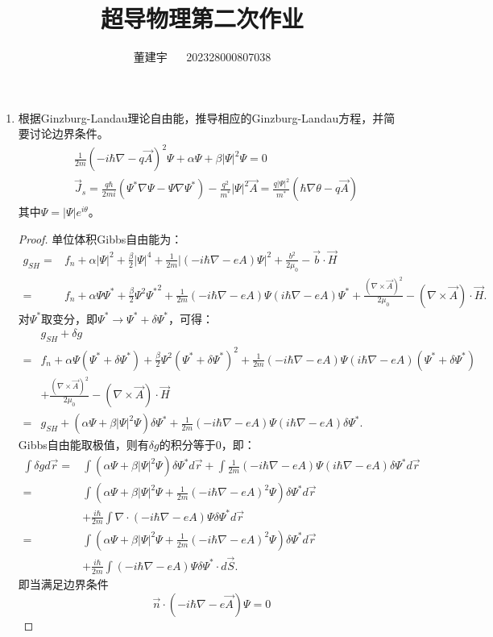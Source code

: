 \documentclass[reqno,a4paper,12pt]{amsart}
\title{超导物理第二次作业}
\author{董建宇 ~~ 202328000807038}
\begin{document}
\maketitle

\begin{enumerate}[1.]

\item 根据Ginzburg-Landau理论自由能，推导相应的Ginzburg-Landau方程，并简要讨论边界条件。
\begin{align*}
	&\frac{1}{2m}(-i\hbar\nabla - q\vec{A})^2\Psi + \alpha \Psi + \beta \vert \Psi \vert^2 \Psi = 0 \\
	&\vec{J}_s = \frac{q\hbar}{2mi}(\Psi^*\nabla\Psi - \Psi\nabla\Psi^*) - \frac{q^2}{m^*} \vert \Psi \vert^2 \vec{A} = \frac{q \vert \Psi \vert^2}{m^*} (\hbar\nabla \theta - q\vec{A})
\end{align*}
其中$\Psi = \vert \Psi \vert e^{i\theta}$。

\begin{proof}
单位体积Gibbs自由能为：
\begin{align*}
	g_{SH} =& f_n + \alpha\vert \Psi \vert^2 + \frac{\beta}{2} \vert \Psi \vert^4 + \frac{1}{2m} \vert (-i\hbar\nabla - eA) \Psi \vert^2 + \frac{b^2}{2\mu_0} - \vec{b} \cdot \vec{H} \\
	=& f_n + \alpha \Psi \Psi^* + \frac{\beta}{2} \Psi^2{\Psi^*}^2 + \frac{1}{2m}(-i\hbar\nabla - eA)\Psi(i\hbar\nabla-eA)\Psi^* + \frac{(\nabla \times \vec{A})^2}{2\mu_0} - (\nabla \times \vec{A}) \cdot \vec{H}.
\end{align*}
对$\Psi^*$取变分，即$\Psi^* \to \Psi^* + \delta \Psi^*$，可得：
\begin{align*}
	&g_{SH} + \delta g \\
	=& f_n + \alpha\Psi(\Psi^*+\delta\Psi^*) + \frac{\beta}{2}\Psi^2(\Psi^*+\delta\Psi^*)^2 + \frac{1}{2m} (-i\hbar\nabla - eA) \Psi (i\hbar\nabla - eA) (\Psi^*+\delta \Psi^*) \\
	&+ \frac{(\nabla\times \vec{A})^2}{2\mu_0} - (\nabla\times\vec{A}) \cdot \vec{H} \\
	=& g_{SH} + (\alpha \Psi + \beta \vert \Psi \vert^2\Psi) \delta\Psi^* + \frac{1}{2m}(-i\hbar\nabla - eA) \Psi (i\hbar\nabla - eA) \delta\Psi^*.
\end{align*}
Gibbs自由能取极值，则有$\delta g$的积分等于0，即：
\begin{align*}
	\int \delta g d\vec{r} =& \int (\alpha \Psi + \beta \vert \Psi \vert^2\Psi) \delta\Psi^* d\vec{r} + \int \frac{1}{2m}(-i\hbar\nabla - eA) \Psi (i\hbar\nabla - eA) \delta\Psi^* d\vec{r} \\
	=& \int \left(\alpha \Psi + \beta \vert \Psi \vert^2 \Psi + \frac{1}{2m}(-i\hbar\nabla - eA)^2\Psi \right) \delta \Psi^* d\vec{r} \\
	&+ \frac{i\hbar}{2m} \int \nabla \cdot (-i\hbar\nabla-eA) \Psi \delta\Psi^* d\vec{r} \\
	=& \int \left(\alpha \Psi + \beta \vert \Psi \vert^2 \Psi + \frac{1}{2m}(-i\hbar\nabla - eA)^2\Psi \right) \delta \Psi^* d\vec{r} \\
	&+ \frac{i\hbar}{2m} \int (-i\hbar\nabla-eA) \Psi \delta\Psi^* \cdot d\vec{S}.
\end{align*}
即当满足边界条件
\[
	\vec{n} \cdot (-i\hbar\nabla - e\vec{A}) \Psi = 0
\]


\end{proof}
\end{enumerate}
\end{document}
